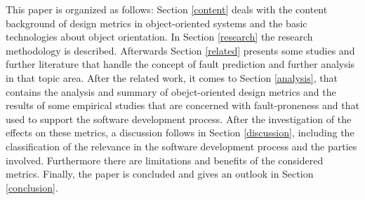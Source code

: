 This paper is organized as follows: Section \ref{content} deals with the content background of design metrics in object-oriented systems and the basic technologies about object orientation. In Section \ref{research} the research methodology is described. Afterwards Section \ref{related} presents some studies and further literature that handle the concept of fault prediction and further analysis in that topic area. After the related work, it comes to Section \ref{analysis}, that contains the analysis and summary of obejct-oriented design metrics and the results of some empirical studies that are concerned with fault-proneness and that used to support the software development process. After the investigation of the effects on these metrics, a discussion follows in Section \ref{discussion}, including the classification of the relevance in the software development process and the parties involved. Furthermore there are limitations and benefits of the considered metrics. Finally, the paper is concluded and gives an outlook in Section \ref{conclusion}.